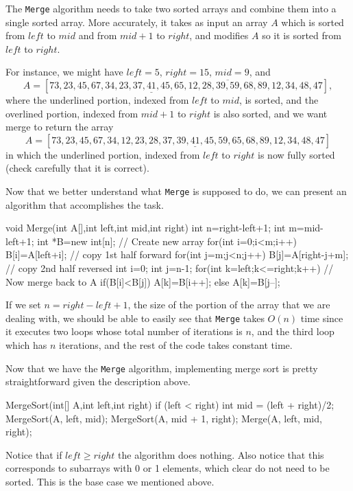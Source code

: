\begin{exa}
The \verb+Merge+ algorithm needs to take two sorted arrays
and combine them into a single sorted array.
More accurately, it takes as input an array $A$ which
is sorted from $left$ to $mid$ and from $mid+1$ to $right$,
and modifies $A$ so it is sorted from $left$ to $right$.

For instance, we might have 
$left=5$, $right=15$, $mid=9$, and 
$$A=[73, 23, 45, 67, 34, \underline{23, 37, 41, 45, 65}, \overline{12, 28, 39, 59, 68, 89}, 12, 34, 48, 47],$$
where the underlined portion, indexed from $left$ to $mid$, is sorted,
and the overlined portion, indexed from $mid+1$ to $right$ is also sorted,
and we want merge to return the array
$$A=[73, 23, 45, 67, 34, \underline{12, 23, 28, 37, 39, 41, 45, 59,  65, 68, 89}, 12, 34, 48, 47]$$
in which the underlined portion, indexed from $left$ to $right$
is now fully sorted (check carefully that it is correct).

Now that we better understand what \verb+Merge+ is supposed to do,
we can present an algorithm that accomplishes the task.
\begin{code}
void Merge(int A[],int left,int mid,int right) {
    int n=right-left+1;
    int m=mid-left+1;
    int *B=new int[n]; // Create new array
    for(int i=0;i<m;i++)
        B[i]=A[left+i]; // copy 1st half forward
    for(int j=m;j<n;j++)
        B[j]=A[right-j+m]; // copy 2nd half reversed
    int i=0; 
    int j=n-1;
    for(int k=left;k<=right;k++) // Now merge back to A
        if(B[i]<B[j]) 
            A[k]=B[i++];
        else
            A[k]=B[j--];
}
\end{code}
If we set $n=right-left+1$, the size of the portion of the array that we are dealing with,
we should be able to easily see that \verb+Merge+ takes $O(n)$ time since 
it executes two loops whose total number of iterations is $n$, and the third loop
which has $n$ iterations, and the rest of the code takes constant time.
\end{exa}

\begin{exa}
Now that we have the \verb+Merge+ algorithm, implementing merge sort is pretty straightforward 
given the description above. 

\begin{code}
MergeSort(int[] A,int left,int right) {
   if (left < right) {
       int mid = (left + right)/2;
       MergeSort(A, left, mid);
       MergeSort(A, mid + 1, right);
       Merge(A, left, mid, right);
   }
}
\end{code}

Notice that if $left\geq right$ the algorithm does nothing.
Also notice that this corresponds to subarrays with 0 or 1 elements, which 
clear do not need to be sorted. This is the base case we mentioned above.
\end{exa}

